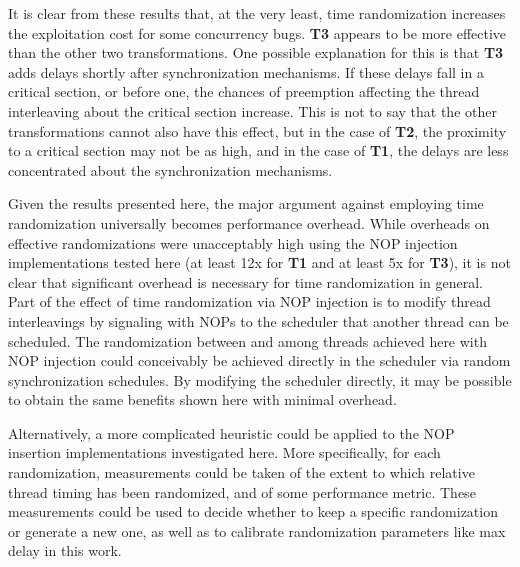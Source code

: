 It is clear from these results that, at the very least, time randomization increases the exploitation cost for some concurrency bugs.
\textbf{T3} appears to be more effective than the other two transformations.
One possible explanation for this is that \textbf{T3} adds delays shortly after synchronization mechanisms.
If these delays fall in a critical section, or before one, the chances of preemption affecting the thread interleaving about the critical section increase.
This is not to say that the other transformations cannot also have this effect, but in the case of \textbf{T2}, the proximity to a critical section may not be as high, and in the case of \textbf{T1}, the delays are less concentrated about the synchronization mechanisms.

Given the results presented here, the major argument against employing time randomization universally becomes performance overhead.
While overheads on effective randomizations were unacceptably high using the NOP injection implementations tested here (at least 12x for \textbf{T1} and at least 5x for \textbf{T3}), it is not clear that significant overhead is necessary for time randomization in general.
Part of the effect of time randomization via NOP injection is to modify thread interleavings by signaling with NOPs to the scheduler that another thread can be scheduled.
The randomization between and among threads achieved here with NOP injection could conceivably be achieved directly in the scheduler via random synchronization schedules.
By modifying the scheduler directly, it may be possible to obtain the same benefits shown here with minimal overhead.

Alternatively, a more complicated heuristic could be applied to the NOP insertion implementations investigated here.
More specifically, for each randomization, measurements could be taken of the extent to which relative thread timing has been randomized, and of some performance metric.
These measurements could be used to decide whether to keep a specific randomization or generate a new one, as well as to calibrate randomization parameters like max delay in this work.